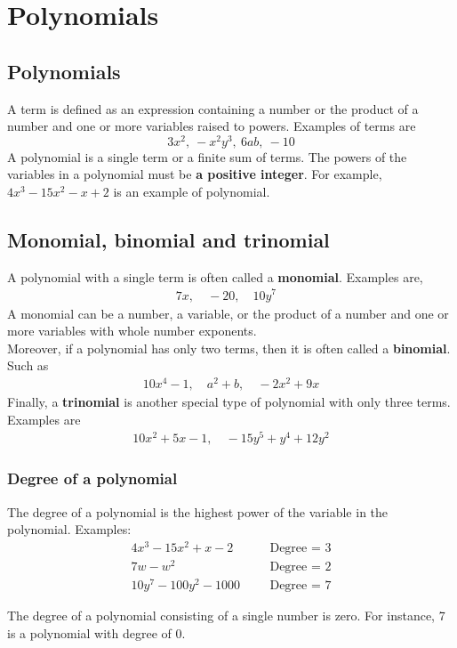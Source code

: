 \chapter{Polynomials}
\section{Polynomials}
A  term  is  defined  as  an  expression  containing  a  number  or  the  product  of  a  number  and  one  or  more  variables  raised  to  powers. Examples of terms are
\begin{equation*}
        3x^2,\ -x^2y^3,\ 6ab,\ -10
\end{equation*}
A  polynomial  is  a  single  term  or  a  finite  sum  of  terms.  The  powers  of  the  variables  in  a  polynomial  must  be  \textbf{a positive  integer}.  For  example, $4x^3-15x^2-x+2$ is an example of polynomial. 
\section{Monomial, binomial and trinomial}
 A polynomial with a single term is often called a \textbf{monomial}. Examples are,
 \begin{align*}
        7x,\quad -20,\quad 10y^7&
 \end{align*}
  A monomial can be a number, a variable, or the product of a number and one or more variables with whole number exponents. \\
Moreover, if a polynomial has only two terms, then it is often called a \textbf{binomial}. Such as
 \begin{align*}
        10x^4-1,\quad a^2+b,\quad -2x^2+9x
 \end{align*}
 Finally, a \textbf{trinomial} is another special type of polynomial with only three terms. Examples are 
 \begin{align*}
        10x^2+5x-1, \quad -15y^5+y^4+12y^2
 \end{align*}
\subsection{Degree of a polynomial}
The degree of a polynomial is the highest power of the variable in the polynomial. Examples:
\begin{align*}
    4x^3−15x^2+x−2& & &\text{Degree = 3}\\
    7w−w^2& &   &\text{Degree = 2}\\
    10y^7-100y^2-1000&  &   &\text{Degree = 7}
\end{align*}
 \begin{nt}
     The degree of a polynomial consisting of a single number is zero. For instance, 7 is a polynomial with degree of 0.
 \end{nt}
